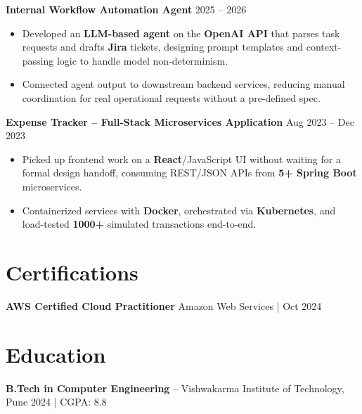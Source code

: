 \documentclass[a4paper,10pt]{article}
\begin{document}
\textbf{Internal Workflow Automation Agent} \hfill 2025 -- 2026
\begin{itemize}[leftmargin=*]
    \item Developed an \textbf{LLM-based agent} on the \textbf{OpenAI API} that parses task requests and drafts \textbf{Jira} tickets, designing prompt templates and context-passing logic to handle model non-determinism.
    \item Connected agent output to downstream backend services, reducing manual coordination for real operational requests without a pre-defined spec.
\end{itemize}

\textbf{Expense Tracker -- Full-Stack Microservices Application} \hfill Aug 2023 -- Dec 2023
\begin{itemize}[leftmargin=*]
    \item Picked up frontend work on a \textbf{React}/JavaScript UI without waiting for a formal design handoff, consuming REST/JSON APIs from \textbf{5+ Spring Boot} microservices.
    \item Containerized services with \textbf{Docker}, orchestrated via \textbf{Kubernetes}, and load-tested \textbf{1000+} simulated transactions end-to-end.
\end{itemize}

\section*{Certifications}
\textbf{AWS Certified Cloud Practitioner} \hfill Amazon Web Services \;|\; Oct 2024

\section*{Education}
\textbf{B.Tech in Computer Engineering} -- Vishwakarma Institute of Technology, Pune \hfill 2024 \;|\; CGPA: 8.8
\end{document}
